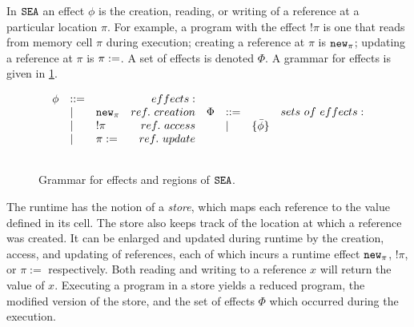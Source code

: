 In $\mathtt{SEA}$ an effect $\phi$ is the creation, reading, or writing of a reference at a particular location $\pi$. For example, a program with the effect $!\pi$ is one that reads from memory cell $\pi$ during execution; creating a reference at $\pi$ is $\mathtt{new}_{\pi}$; updating a reference at $\pi$ is $\mathtt{\pi :=}$. A set of effects is denoted $\Phi$. A grammar for effects is given in \ref{fig:fxtute_fx_regions}.

\begin{figure}[h]

\[
\begin{array}{c}

\begin{array}{lllr}

\phi & ::= & ~ & effects: \\
	& | & \mathtt{new}_{\pi} & ref.~creation\\
	& | & !\pi & ref.~access \\
	& | & \pi := & ref.~update \\
	&&\\
	
\end{array}
	
\begin{array}{lllr}

\Phi & ::= & ~ & sets~of~effects: \\
	& | & \{ \bar \phi \} \\
	&&\\
	
\end{array}
	
\end{array}
\]

\vspace{-12pt}
\caption{Grammar for effects and regions of $\mathtt{SEA}$.}
\label{fig:fxtute_fx_regions}
\end{figure}

The runtime has the notion of a \textit{store}, which maps each reference to the value defined in its cell. The store also keeps track of the location at which a reference was created. It can be enlarged and updated during runtime by the creation, access, and updating of references, each of which incurs a runtime effect $\mathtt{new}_{\pi}$, $!\pi$, or $\pi :=$ respectively. Both reading and writing to a reference $x$ will return the value of $x$. Executing a program in a store yields a reduced program, the modified version of the store, and the set of effects $\Phi$ which occurred during the execution.

